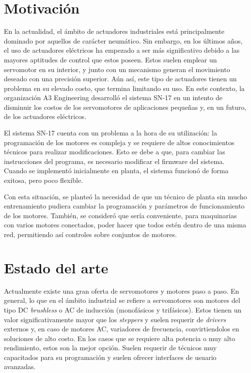
\section{Motivación}

En la actualidad, el ámbito de actuadores industriales está principalmente dominado por aquellos de carácter neumático. Sin embargo, en los últimos años, el uso de actuadores eléctricos ha empezado a ser más significativo debido a las mayores aptitudes de control que estos poseen. Estos suelen emplear un servomotor en su interior, y junto con un mecanismo generan el movimiento deseado con una precisión superior. Aún así, este tipo de actuadores tienen un problema en su elevado costo, que termina limitando su uso. En este contexto, la organización A3 Engineering desarrolló el sistema SN-17 en un intento de disminuir los costos de los servomotores de aplicaciones pequeñas y, en un futuro, de los actuadores eléctricos.

El sistema SN-17 cuenta con un problema a la hora de su utilización: la programación de los motores es compleja y se requiere de altos conocimientos técnicos para realizar modificaciones. Esto se debe a que, para cambiar las instrucciones del programa, es necesario modificar el firmware del sistema. Cuando se implementó inicialmente en planta, el sistema funcionó de forma exitosa, pero poco flexible. 

Con esta situación, se planteó la necesidad de que un técnico de planta sin mucho entrenamiento pudiera cambiar la programación y parámetros de funcionamiento de los motores. También, se consideró que sería conveniente, para maquinarias con varios motores conectados, poder hacer que todos estén dentro de una misma red, permitiendo así controles sobre conjuntos de motores.



\section{Estado del arte}

Actualmente existe una gran oferta de servomotores y motores paso a paso. En general, lo que en el ámbito industrial se refiere a servomotores\citep{Industrial_Automation_Hands_On} son motores del tipo DC \textit{brushless} o AC de inducción (monofásicos y trifásicos). Estos tienen un valor significativamente mayor que los \textit{steppers} y suelen requerir de \textit{drivers} externos y, en caso de motores AC, variadores de frecuencia, convirtiendolos en soluciones de alto costo. En los casos que se requiere alta potencia o muy alto rendimiento, estos son la mejor opción. Suelen requerir de técnicos muy capacitados para su programación y suelen ofrecer interfaces de usuario avanzadas.

